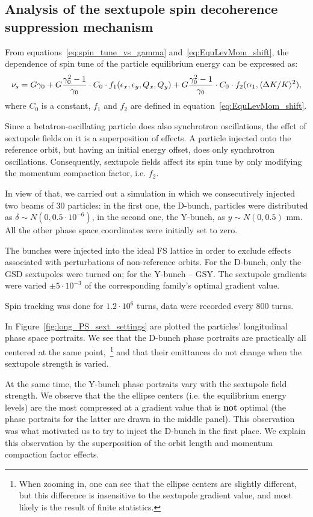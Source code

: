 \subsection{Analysis of the sextupole spin decoherence suppression mechanism}\label{sec:sext_decoh_suppression_effect_analysis}
From equations~\eqref{eq:spin_tune_vs_gamma} and~\eqref{eq:EquLevMom_shift}, the dependence of spin tune of the
particle equilibrium energy can be expressed as:
\[
\nu_s = G\gamma_0 + G\frac{\gamma_0^2-1}{\gamma_0}\cdot C_0\cdot f_1(\epsilon_x, \epsilon_y, Q_x, Q_y)+ G\frac{\gamma_0^2-1}{\gamma_0}\cdot C_0\cdot f_2(\alpha_1, \avg{\Delta K/K}^2),
\]
where $C_0$ is a constant, $f_1$ and $f_2$ are defined in equation~\eqref{eq:EquLevMom_shift}.

Since a betatron-oscillating particle does also synchrotron oscillations, the effct of sextupole fields on it
is a superposition of effects. A particle injected onto the reference orbit, but having an initial energy
offset, does only synchrotron oscillations. Consequently, sextupole fields affect its spin tune by only
modifying the momentum compaction factor, i.e. $f_2$.

In view of that, we carried out a simulation in which we consecutively injected two beams of 30 particles:
in the first one, the D-bunch, particles were distributed as $\delta\sim N(0, 0.5\cdot 10^{-6})$, 
in the second one, the Y-bunch, as $y\sim N(0, 0.5)$ mm. All the other phase space coordinates were initially
set to zero.

The bunches were injected into the ideal FS lattice in order to exclude effects associated with perturbations
of non-reference orbits. For the D-bunch, only the GSD sextupoles were turned on; for the Y-bunch -- GSY. The
sextupole gradients were varied $\pm 5\cdot 10^{-3}$ of the corresponding family's optimal gradient value.

Spin tracking was done for $1.2\cdot 10^6$ turns, data were recorded every 800 turns.

In Figure~\ref{fig:long_PS_sext_settings} are plotted the particles' longitudinal phase space portraits. 
We see that the D-bunch phase portraits are practically all centered at the same point,~\footnote{When zooming 	in, one can see that the ellipse centers are slightly different, but this difference is insensitive to
	the sextupole gradient value, and most likely is the result of finite statistics.} and that their 
emittances do not change when the sextupole strength is varied.

At the same time, the Y-bunch phase portraits vary with the sextupole field strength. We observe that the 
the ellipse centers (i.e. the equilibrium energy levels) are the most compressed at a gradient value that is
\textbf{not} optimal (the phase portraits for the latter are drawn in the middle panel). This observation
was what motivated us to try to inject the D-bunch in the first place. We explain this observation by the
superposition of the orbit length and momentum compaction factor effects.

